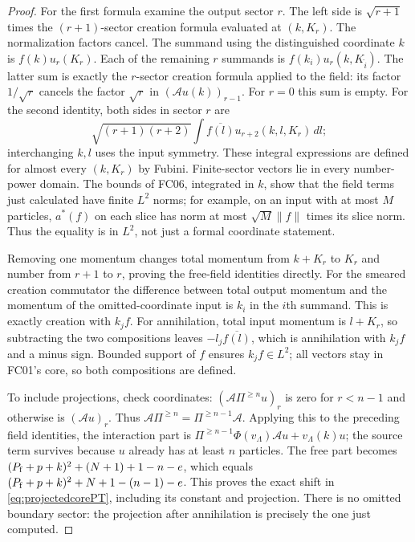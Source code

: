 \documentclass[11pt,a4paper]{article}
\theoremstyle{remark}\newtheorem{remark}[theorem]{Remark}
\begin{document}
\begin{proof}
For the first formula examine the output sector $r$. The left side is $\sqrt{r+1}$ times the $(r+1)$-sector creation formula evaluated at $(k,K_r)$. The normalization factors cancel. The summand using the distinguished coordinate $k$ is $f(k)u_r(K_r)$. Each of the remaining $r$ summands is $f(k_i)u_r(k,K_{\widehat i})$. The latter sum is exactly the $r$-sector creation formula applied to the field: its factor $1/\sqrt r$ cancels the factor $\sqrt r$ in $(\mathcal Au(k))_{r-1}$. For $r=0$ this sum is empty. For the second identity, both sides in sector $r$ are
\[
 \sqrt{(r+1)(r+2)}\int\overline{f(l)}u_{r+2}(k,l,K_r)\,dl;
\]
interchanging $k,l$ uses the input symmetry. These integral expressions are defined for almost every $(k,K_r)$ by Fubini. Finite-sector vectors lie in every number-power domain. The bounds of FC06, integrated in $k$, show that the field terms just calculated have finite $L^2$ norms; for example, on an input with at most $M$ particles, $a^*(f)$ on each slice has norm at most $\sqrt M\|f\|$ times its slice norm. Thus the equality is in $L^2$, not just a formal coordinate statement.

Removing one momentum changes total momentum from $k+K_r$ to $K_r$ and number from $r+1$ to $r$, proving the free-field identities directly. For the smeared creation commutator the difference between total output momentum and the momentum of the omitted-coordinate input is $k_i$ in the $i$th summand. This is exactly creation with $k_jf$. For annihilation, total input momentum is $l+K_r$, so subtracting the two compositions leaves $-l_j\overline{f(l)}$, which is annihilation with $k_jf$ and a minus sign. Bounded support of $f$ ensures $k_jf\in L^2$; all vectors stay in FC01's core, so both compositions are defined.

To include projections, check coordinates: $(\mathcal A\Pi^{\geq n}u)_r$ is zero for $r<n-1$ and otherwise is $(\mathcal Au)_r$. Thus $\mathcal A\Pi^{\geq n}=\Pi^{\geq n-1}\mathcal A$. Applying this to the preceding field identities, the interaction part is
$\Pi^{\geq n-1}\Phi(v_\Lambda)\mathcal Au+v_\Lambda(k)u$; the source term survives because $u$ already has at least $n$ particles. The free part becomes
$(P_{\rm f}+p+k)^2+(N+1)+1-n-e$, which equals
$(P_{\rm f}+p+k)^2+N+1-(n-1)-e$.
This proves the exact shift in \eqref{eq:projectedcorePT}, including its constant and projection. There is no omitted boundary sector: the projection after annihilation is precisely the one just computed.
\end{proof}
\end{document}
